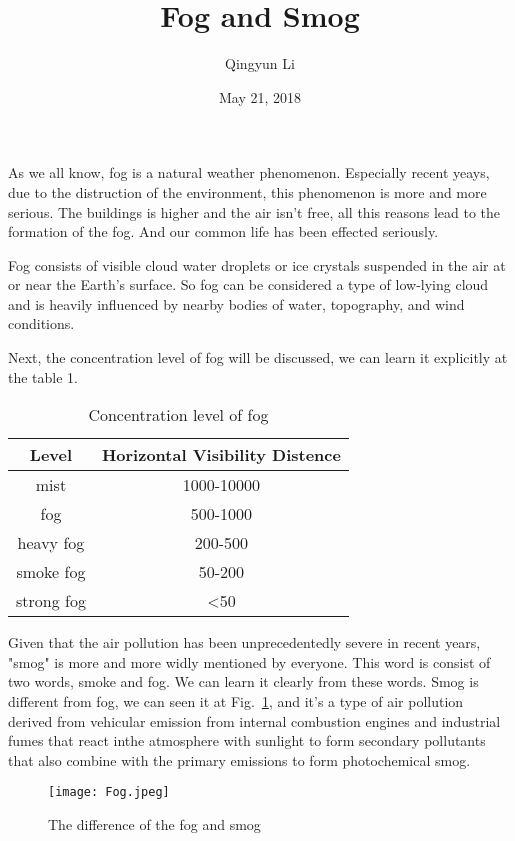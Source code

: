 \documentclass{article}
\author{Qingyun Li}
\date{May 21, 2018}
\title{Fog and Smog}
\begin{document}
\maketitle
 \par As we all know, fog is a natural weather phenomenon. Especially recent yeays, due to the distruction of the   environment, this phenomenon is more and more serious. The buildings is higher and the air isn't free, all this reasons lead to the formation of the fog. And our common life has been effected seriously. 
 \par Fog consists of visible cloud water droplets or ice crystals suspended in the air at or near the Earth's surface\cite{gultepe2008fog}. So fog can be considered a type of low-lying cloud and is heavily influenced by nearby bodies of water, topography, and wind conditions.
 \par Next, the concentration level of fog will be discussed, we can learn it explicitly at the table 1.
\begin{table}[htbp]
\centering
\caption{Concentration level of fog}
\begin{tabular}{c|c}
\hline
Level & Horizontal Visibility Distence \\
\hline
mist & 1000-10000 \\
fog & 500-1000 \\
heavy fog & 200-500 \\
smoke fog & 50-200 \\
strong fog & <50 \\
\hline 
\end{tabular} 
\end{table}
 \par Given that the air pollution has been unprecedentedly severe in recent years, "smog" is more and more widly mentioned by everyone. This word is consist of two words, smoke and fog. We can learn it clearly from these words. Smog is different from fog, we can seen it at Fig.~\ref{differnce}, and it's a type of air pollution derived from vehicular emission from internal combustion engines and industrial fumes that react inthe atmosphere with sunlight to form secondary pollutants that also combine with the primary emissions to form photochemical smog.
 \begin{figure}[htbp]
\begin{minipage}{1\linewidth}
\centering{}
\texttt{[image: Fog.jpeg]}\\
\caption{The difference of the fog and smog}\label{differnce}
\end{minipage}
\end{figure}


\end{document}
